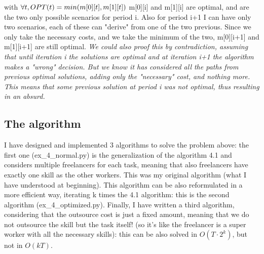 with $\forall t, OPT(t) = min (m[0][t], m[1][t]) \newline$
m[0][i] and m[1][i] are optimal, and are the two only possible scenarios for period i. Also for period i+1 I can have only two scenarios, each of these can "derive" from one of the two previous. Since we only take the necessary costs, and we take the minimum of the two, m[0][i+1] and m[1][i+1] are still optimal.
\textit{We could also proof this by contradiction, assuming that until iteration i the solutions are optimal and at iteration i+1 the algorithm makes a "wrong" decision. But we know it has considered all the paths from previous optimal solutions, adding only the "necessary" cost, and nothing more. This means that some previous solution at period i was not optimal, thus resulting in an absurd. 
}
\subsection{The algorithm}
I have designed and implemented 3 algorithms to solve the problem above: the first one (ex\_4\_normal.py) is the generalization of the algorithm 4.1 and considers multiple freelancers for each task, meaning that also freelancers have exactly one skill as the other workers. This was my original algorithm (what I have understood at beginning). This algorithm can be also reformulated in a more efficient way, iterating k times the 4.1 algorithm: this is the second algorithm (ex\_4\_optimized.py). Finally, I have written a third algorithm, considering that the outsource cost is just a fixed amount, meaning that we do not outsource the skill but the task itself! (so it's like the freelancer is a super worker with all the necessary skills): this can be also solved in $O(T \cdot 2^k)$, but not in $O(kT)$.
